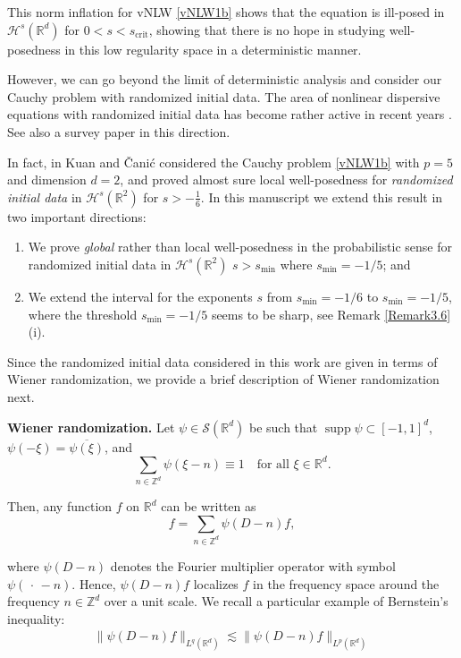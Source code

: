 \documentclass[letterpaper, 11pt,  reqno]{amsart}
\DeclareMathOperator*{\supp}{supp}
\newcommand{\1}{\hspace{0.5mm}\text{I}\hspace{0.2mm}}
\newcommand{\noi}{\noindent}
\newcommand{\Z}{\mathbb{Z}}
\newcommand{\R}{\mathbb{R}}
\newcommand{\les}{\lesssim}
\renewcommand{\H}{\mathcal{H}}
\numberwithin{equation}{section}
\numberwithin{theorem}{section}
\begin{document}
This norm inflation for vNLW \eqref{vNLW1b} shows that the equation
is ill-posed in $\H^s(\R^d)$ for $0 < s < s_\text{crit}$, 
showing that there is no hope in 
 studying well-posedness in this low regularity space
in a deterministic manner.

However, we can go beyond the limit of deterministic analysis
and consider our Cauchy problem with randomized initial data.
The area of nonlinear dispersive equations with randomized initial
data has become rather active in recent years \cite{BO96, BT1, CO, LM, BT3, BOP1, BOP2, Poc, OOP, BOP3}.
See also a survey paper \cite{BOP4} in this direction.

In fact, in \cite{KC}
Kuan and \v{C}ani\'c
considered the Cauchy problem \eqref{vNLW1b} 
with $p = 5$ and dimension $d = 2$, and proved almost sure local well-posedness
for {\emph{randomized initial data}} in $\H^s(\R^2)$ for $ s> -\frac 16$.
In this manuscript we extend this result in two important directions:
\begin{enumerate}
\item We prove {\emph{global}} rather than local well-posedness in the probabilistic sense for randomized initial data in $\H^s(\R^2)$ 
$s > s_\text{min}$ where $s_\text{min} = -1/5$; and
\item We extend the interval for the exponents $s$ from $s_\text{min} = -1/6$ to $s_\text{min} = -1/5$,
where the threshold $s_\text{min} = -1/5$ seems to be sharp, see Remark \ref{Remark3.6}(i).
\end{enumerate}
Since the randomized initial data considered in this work are given in terms of Wiener randomization,
we provide a brief description of Wiener randomization next.

{\bf{Wiener randomization.}}
\label{SUBSEC:Wiener}
Let $\psi \in \mathcal{S}(\R^d)$ 
be such that $\supp \psi \subset [-1, 1]^d$,  $\psi(-\xi ) = \overline{\psi(\xi)}$,
and 
\[ \sum_{n \in \Z^d} \psi(\xi - n) \equiv 1 \quad \text{for all }\xi \in \R^d.\]


\noi
Then, any function $f$ on $\R^d$ can be written as
\begin{equation}
f = \sum_{n \in \Z^d} \psi(D-n) f,
\label{B1}
 \end{equation}

\noi
where $ \psi (D-n) $ denotes the Fourier multiplier operator
with symbol $\psi (\,\cdot\, -n)$. Hence, $\psi(D - n)f$ localizes $f$ in the frequency space around the frequency $n \in \mathbb{Z}^{d}$ over a unit scale. 
We recall a particular example of  Bernstein's inequality:
\begin{align}
\|\psi(D-n) f \|_{L^q(\R^d)}
\les \|\psi(D-n) f \|_{L^p(\R^d)}
\label{B2}
\end{align}
\end{document}
